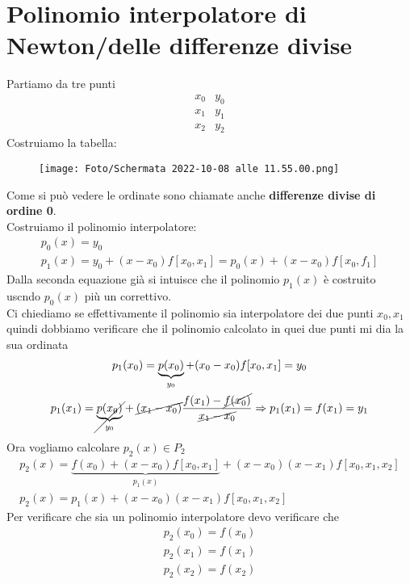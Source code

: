 \documentclass[a4paper, portrait]{book}
\numberwithin{equation}{chapter} %
\begin{document}
\section{Polinomio interpolatore di Newton/delle differenze divise}
Partiamo da tre punti
\begin{equation*}
    \begin{matrix}
        x_0&y_0\\
        x_1&y_1\\
        x_2&y_2
    \end{matrix}
\end{equation*}
Costruiamo la tabella:
\begin{figure}[h!]
    \centering
    \texttt{[image: Foto/Schermata 2022-10-08 alle 11.55.00.png]}
    \caption{}
\end{figure}
Come si può vedere le ordinate sono chiamate anche \textbf{differenze divise di ordine 0}.\\
Costruiamo il polinomio interpolatore:
\begin{gather}
    p_0(x) = y_0\\
    p_1(x) = y_0 + (x-x_0)f[x_0,x_1] = p_0(x) + (x-x_0)f[x_0,f_1]
\end{gather}
Dalla seconda equazione già si intuisce che il polinomio $p_1(x)$ è costruito uscndo $p_0(x)$ più un correttivo.\\
Ci chiediamo se effettivamente il polinomio sia interpolatore dei due punti $x_0, x_1$ quindi dobbiamo verificare che il polinomio calcolato in quei due punti mi dia la sua ordinata
\begin{gather}
    p_1(x_0) = \underbrace{p(x_0)}_{y_0} + (x_0 - x_0) f[x_0,x_1] = y_0\\
    p_1(x_1) = \cancel{\underbrace{p(x_0)}_{y_0}} + \cancel{(x_1 - x_0)}\frac{f(x_1)-\cancel{f(x_0)}}{\cancel{x_1-x_0}} \Rightarrow p_1(x_1) = f(x_1) = y_1
\end{gather}
Ora vogliamo calcolare $p_2(x) \in P_2$
\begin{gather}
    p_2(x) = \underbrace{f(x_0) + (x-x_0)f[x_0,x_1]}_{p_1(x)} + (x-x_0)(x-x_1)f[x_0,x_1,x_2]\\
    p_2(x) = p_1(x) + (x-x_0)(x-x_1)f[x_0,x_1,x_2]
\end{gather}
Per verificare che sia un polinomio interpolatore devo verificare che 
\begin{gather}
    p_2(x_0) = f(x_0)\\
    p_2(x_1) = f(x_1)\\
    p_2(x_2) = f(x_2)
\end{gather}
\end{document}
